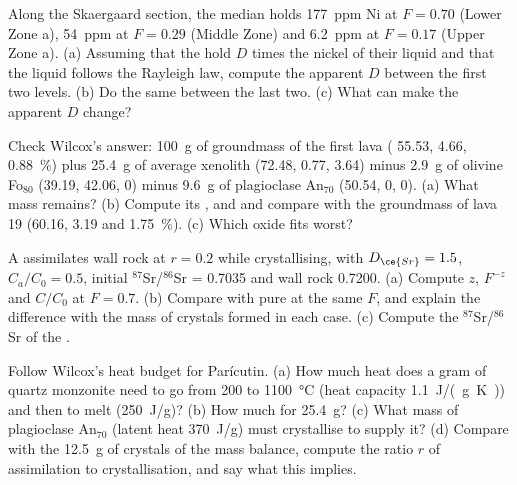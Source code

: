 \begin{exercise}[$\star\star$]\label{exo:b2:magmatic-differentiation:8}
Along the Skaergaard section, the median  holds \qty{177}{ppm} Ni at
$F = 0.70$ (Lower Zone a), \qty{54}{ppm} at $F = 0.29$ (Middle Zone) and
\qty{6.2}{ppm} at $F = 0.17$ (Upper Zone a). (a) Assuming that the  hold
$D$ times the nickel of their liquid and that the liquid follows the Rayleigh law,
compute the apparent $D$ between the first two levels. (b) Do the same between the
last two. (c) What can make the apparent $D$ change?
\end{exercise}

\begin{exercise}[$\star\star$]\label{exo:b2:magmatic-differentiation:9}
Check Wilcox's answer: \qty{100}{g} of groundmass of the first lava (
55.53,  4.66,  \qty{0.88}{\percent}) plus \qty{25.4}{g} of average
xenolith (72.48, 0.77, 3.64) minus \qty{2.9}{g} of olivine Fo$_{80}$ (39.19, 42.06, 0)
minus \qty{9.6}{g} of plagioclase An$_{70}$ (50.54, 0, 0). (a) What mass remains?
(b) Compute its ,  and  and compare with the groundmass of
lava 19 (60.16, 3.19 and \qty{1.75}{\percent}). (c) Which oxide fits worst?
\end{exercise}

\begin{exercise}[$\star\star\star$]\label{exo:b2:magmatic-differentiation:10}
A  assimilates wall rock at $r = 0.2$ while crystallising, with $D_{\ce{Sr}} =
1.5$, $C_a/C_0 = 0.5$, initial $^{87}$Sr/$^{86}$Sr = 0.7035 and wall rock 0.7200.
(a) Compute $z$, $F^{-z}$ and $C/C_0$ at $F = 0.7$. (b) Compare with pure  at the same $F$, and explain the difference with the mass of crystals
formed in each case. (c) Compute the $^{87}$Sr/$^{86}$Sr of the .
\end{exercise}

\begin{exercise}[$\star\star\star$]\label{exo:b2:magmatic-differentiation:11}
Follow Wilcox's heat budget for Parícutin. (a) How much heat does a gram of quartz
monzonite need to go from 200 to \qty{1100}{\celsius} (heat capacity
\qty{1.1}{J/(g.K)}) and then to melt (\qty{250}{J/g})? (b) How much for
\qty{25.4}{g}? (c) What mass of plagioclase An$_{70}$ (latent heat \qty{370}{J/g})
must crystallise to supply it? (d) Compare with the \qty{12.5}{g} of crystals of the
mass balance, compute the ratio $r$ of assimilation to crystallisation, and say what
this implies.
\end{exercise}

